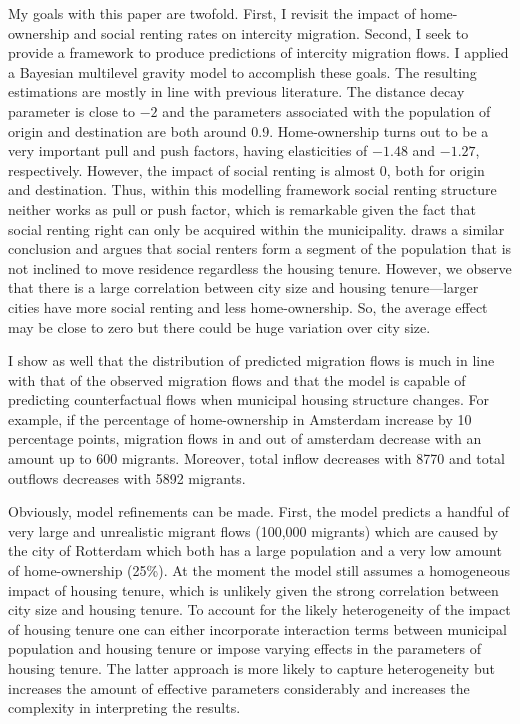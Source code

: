 \documentclass[fleqn,10pt]{SelfArx} %
\begin{document}
{{My goals with this paper are twofold. First, I revisit the impact of
home-ownership and social renting rates on intercity migration. Second, I seek
to provide a framework to produce predictions of intercity migration flows.  I
applied a Bayesian multilevel gravity model to accomplish these goals. The
resulting estimations are mostly in line with previous literature.  The distance
decay parameter is close to $-2$ and the parameters associated with the
population of origin and destination are both around 0.9.  Home-ownership turns
out to be a very important pull and push factors, having elasticities of $-1.48$
and $-1.27$, respectively. However, the impact of social renting is almost 0,
both for origin and destination. Thus, within this modelling framework social
renting structure neither works as pull or push factor, which is remarkable
given the fact that social renting right can only be acquired within the
municipality. \citet{boyle1998migration} draws a similar conclusion and argues
that social renters form a segment of the population that is not inclined to
move residence regardless the housing tenure. However, we observe that there is
a large correlation between city size and housing tenure---larger cities have
more social renting and less home-ownership. So, the average effect may be close
to zero but there could be huge variation over city size.

I show as well that the distribution of predicted migration flows is much in
line with that of the observed migration flows and that the model is capable of
predicting counterfactual flows when municipal housing structure changes. For
example, if the percentage of home-ownership in Amsterdam increase by 10
percentage points, migration flows in and out of amsterdam decrease with an
amount up to 600 migrants. Moreover, total inflow decreases with 8770 and total
outflows decreases with 5892 migrants.

Obviously, model refinements can be made. First, the model predicts a handful of
very large and unrealistic migrant flows (100,000 migrants) which are caused by
the city of Rotterdam which both has a large population and a very low amount of
home-ownership (25\%). At the moment the model still assumes a homogeneous
impact of housing tenure, which is unlikely given the strong correlation between
city size and housing tenure. To account for the likely heterogeneity of the
impact of housing tenure one can either incorporate interaction terms between
municipal population and housing tenure or impose varying effects in the
parameters of housing tenure. The latter approach is more likely to capture
heterogeneity but increases the amount of effective parameters considerably and
increases the complexity in interpreting the results.

}}
\end{document}
